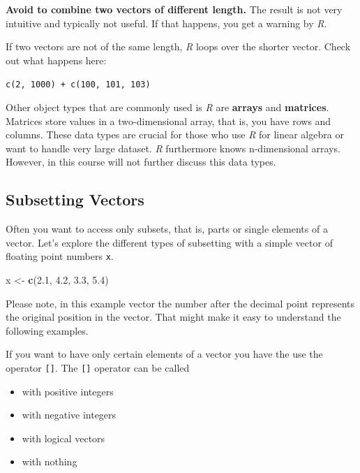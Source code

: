 \documentclass[
]{scrartcl}
\makeatletter
\newenvironment{Shaded}{\begin{snugshade}}{\end{snugshade}}
\newcommand{\FloatTok}[1]{\textcolor[rgb]{0.00,0.00,0.81}{#1}}
\newcommand{\FunctionTok}[1]{\textcolor[rgb]{0.13,0.29,0.53}{\textbf{#1}}}
\newcommand{\NormalTok}[1]{#1}
\newcommand{\OtherTok}[1]{\textcolor[rgb]{0.56,0.35,0.01}{#1}}
\providecommand{\tightlist}{%
  \setlength{\itemsep}{0pt}\setlength{\parskip}{0pt}}
\newenvironment{kframe}{%
\medskip{}
\setlength{\fboxsep}{.8em}
 \def\at@end@of@kframe{}%
 \ifinner\ifhmode%
  \def\at@end@of@kframe{\end{minipage}}%
  \begin{minipage}{\columnwidth}%
 \fi\fi%
 \def\FrameCommand##1{\hskip\@totalleftmargin \hskip-\fboxsep
 \colorbox{shadecolor}{##1}\hskip-\fboxsep
     \hskip-\linewidth \hskip-\@totalleftmargin \hskip\columnwidth}%
 \MakeFramed {\advance\hsize-\width
   \@totalleftmargin\z@ \linewidth\hsize
   \@setminipage}}%
 {\par\unskip\endMakeFramed%
 \at@end@of@kframe}
\newenvironment{rmdblock}[1]
  {
  \begin{itemize}
  \renewcommand{\labelitemi}{
    \raisebox{-.7\height}[0pt][0pt]{
      {\setkeys{Gin}{width=3em,keepaspectratio}\texttt{[image: images/\#1]}}
    }
  }
  \setlength{\fboxsep}{1em}
  \begin{kframe}
  \item
  }
  {
  \end{kframe}
  \end{itemize}
  }
\newenvironment{geek}
    {\begin{rmdblock}{geek}}
    {\end{rmdblock}}
\makeatother
\begin{document}
\textbf{Avoid to combine two vectors of different length.} The result is not very intuitive and typically not useful. If that happens, you get a warning by \emph{R}.

\begin{geek}
If two vectors are not of the same length, \emph{R} loops over the
shorter vector. Check out what happens here:

\texttt{c(2,\ 1000)\ +\ c(100,\ 101,\ 103)}
\end{geek}

Other object types that are commonly used is \emph{R} are \textbf{arrays} and \textbf{matrices}. Matrices store values in a two-dimensional array, that is, you have rows and columns. These data types are crucial for those who use \emph{R} for linear algebra or want to handle very large dataset. \emph{R} furthermore knows n-dimensional arrays. However, in this course will not further discuss this data types.

\hypertarget{subsetting}{%
\subsection{Subsetting Vectors}\label{subsetting}}

Often you want to access only subsets, that is, parts or single elements of a vector. Let's explore the different types of subsetting with a simple vector of floating point numbers \texttt{x}.

\begin{Shaded}
\begin{Highlighting}[]
\NormalTok{x }\OtherTok{\textless{}{-}} \FunctionTok{c}\NormalTok{(}\FloatTok{2.1}\NormalTok{, }\FloatTok{4.2}\NormalTok{, }\FloatTok{3.3}\NormalTok{, }\FloatTok{5.4}\NormalTok{)}
\end{Highlighting}
\end{Shaded}

Please note, in this example vector the number after the decimal point represents the original position in the vector. That might make it easy to understand the following examples.

If you want to have only certain elements of a vector you have the use the operator \texttt{{[}{]}}. The \texttt{{[}{]}} operator can be called

\begin{itemize}
\tightlist
\item
  with positive integers
\item
  with negative integers
\item
  with logical vectors
\item
  with nothing
\end{itemize}
\end{document}
